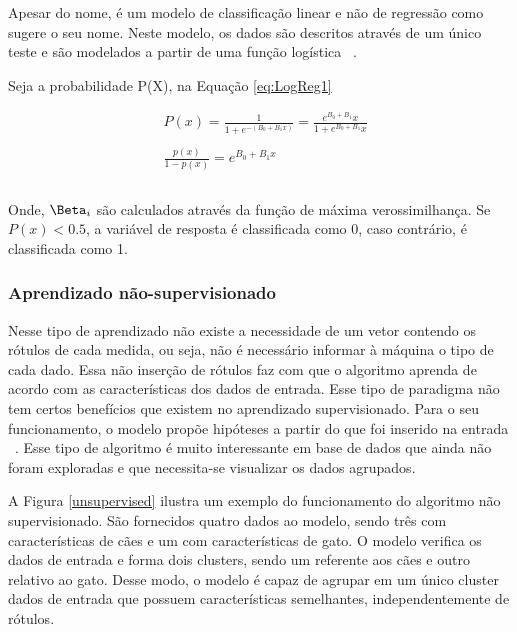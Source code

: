           Apesar do nome, é um modelo de classificação linear e não de regressão como sugere o seu nome. Neste modelo, os dados
          são descritos através de um único teste e são modelados a partir de uma função logística ~\cite{nasrabadi2007pattern}.

          Seja a probabilidade P(X), na Equação \ref{eq:LogReg1}


          \begin{equation}\label{eq:LogReg1}
            \begin{aligned}
              & P(x) = \frac{1}{1+e^{-(B_{0}+B_{1}x)}} = \frac{e^{B_{0} + B_{1}}x}{1+e^{B_{0}+B_{1}}x }\\ \\
              & \frac{p(x)}{1-p(x)} = e^{B_{0}+B_{1}x}\\ \\
          \end{aligned} 
          \end{equation}
         
          Onde, $\Beta_{i}$ são calculados através da função de máxima verossimilhança. Se $P(x)< 0.5$, a variável de resposta é classificada como 0, caso contrário, é classificada como 1.

    \subsubsection{Aprendizado não-supervisionado}

          Nesse tipo de aprendizado não existe a necessidade de um vetor contendo os rótulos de cada medida, ou seja, não é 
          necessário informar à máquina o tipo de cada dado. Essa não inserção de rótulos faz com que o algoritmo aprenda de acordo 
          com as características dos dados de entrada. Esse tipo de paradigma não tem certos benefícios que existem  no aprendizado supervisionado. 
          Para o seu funcionamento, o modelo propõe hipóteses a partir do que foi inserido na entrada ~\cite{bonaccorso2017machine}. Esse tipo de algoritmo 
          é muito interessante em base de dados que ainda não foram exploradas e que necessita-se visualizar os dados agrupados.

          A Figura \ref{unsupervised} ilustra um exemplo do funcionamento do algoritmo não supervisionado. São fornecidos quatro dados ao modelo, sendo três com características de cães e um com características de gato. O modelo verifica os dados de entrada e forma dois clusters, sendo um referente aos cães e outro relativo ao gato. Desse modo, o modelo é capaz de agrupar em um único cluster dados de entrada que possuem características semelhantes, independentemente de rótulos.

